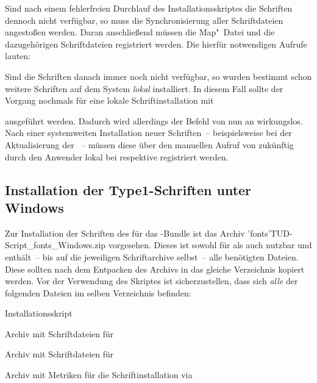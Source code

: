 Sind nach einem fehlerfreien Durchlauf des Installationsskriptes die Schriften 
dennoch nicht verfügbar, so muss die Synchronisierung aller Schriftdateien 
angestoßen werden. Daran anschließend müssen die Map"~Datei und die 
dazugehörigen Schriftdateien registriert werden. Die hierfür notwendigen 
Aufrufe lauten:
%
\begin{quoting}
\RET*
{}\RET*
{}\RET
\end{quoting}
%
Sind die Schriften danach immer noch nicht verfügbar, so wurden bestimmt schon 
weitere Schriften auf dem System \emph{lokal} installiert. In diesem Fall 
sollte der Vorgang nochmals für eine lokale Schriftinstallation mit 
%
\begin{quoting}
\RET*
{}\RET*
{}\RET
\end{quoting}
%
ausgeführt werden. Dadurch wird allerdings der Befehl  von nun 
an wirkungslos. Nach einer systemweiten Installation neuer Schriften~-- 
beispielsweise bei der Aktualisierung der \Distro~-- 
müssen diese über den manuellen Aufruf von  zukünftig durch den 
Anwender lokal bei \TeXLive respektive \MacTeX registriert werden.




\subsection{%
  Installation der Type1-Schriften unter Windows%
  \label{sec:install:win}%
}

Zur Installation der Schriften des \CDs für das \TUDScript-Bundle ist das 
Archiv \GitHubDownload'fonts'{TUD-Script_fonts_Windows.zip} vorgesehen. Dieses 
ist sowohl für \TeXLive als auch \MiKTeX nutzbar und enthält~-- bis auf die 
jeweiligen Schriftarchive selbst~-- alle benötigten Dateien. Diese sollten nach 
dem Entpacken des Archivs in das gleiche Verzeichnis kopiert werden. Vor der 
Verwendung des Skriptes  ist sicherzustellen, 
dass sich \emph{alle} der folgenden Dateien im selben Verzeichnis befinden:
%
\settowidth{}%
\begin{description}[labelwidth=\tudscrdim,labelsep=1em]
  \item[\File*{tudscr_fonts_install.bat}]Installationsskript
  \item[\File*{Univers_PS.zip}]Archiv mit Schriftdateien für \Univers
  \item[\File*{DIN_Bd_PS.zip}]Archiv mit Schriftdateien für \DIN
  \item[\File*{tudscr_fonts_install.zip}]Archiv mit Metriken für die
    Schriftinstallation via 
\end{description}

